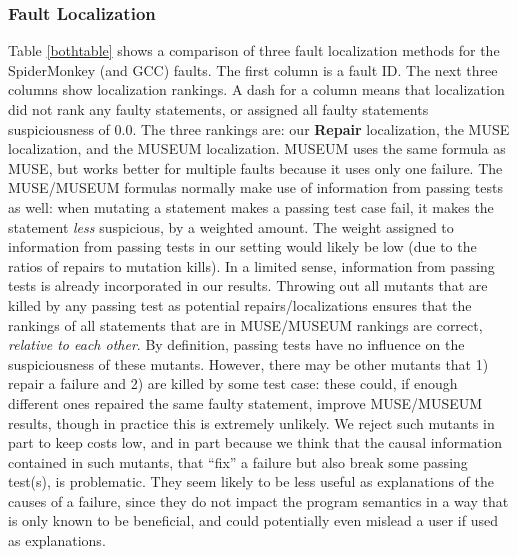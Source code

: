\subsubsection{Fault Localization}

Table \ref{bothtable} shows a comparison of three fault localization methods for the SpiderMonkey (and GCC) faults.  The first column is a fault ID. The next three columns show localization rankings.  A dash for a column means that localization did not rank any faulty statements, or assigned all faulty statements suspiciousness of 0.0.  The three rankings are: our {\bf Repair} localization, the MUSE \cite{MUSE} localization, and the MUSEUM \cite{multilingual} localization.  MUSEUM uses the same formula as MUSE, but works better for multiple faults because it uses only one failure.  The MUSE/MUSEUM formulas normally make use of information from passing tests as well: when mutating a statement makes a passing test case fail, it makes the statement \emph{less} suspicious, by a weighted amount. The weight assigned to information from passing tests in our setting would likely be low (due to the ratios of repairs to mutation kills).  In a limited sense, information from passing tests is already incorporated in our results.  Throwing out all mutants that are killed by any passing test as potential repairs/localizations ensures that the rankings of all statements that are in MUSE/MUSEUM rankings are correct, \emph{relative to each other}.  By definition, passing tests have no influence on the suspiciousness of these mutants.  However, there may be other mutants that 1) repair a failure and 2) are killed by some test case: these could, if enough different ones repaired the same faulty statement, improve MUSE/MUSEUM results, though in practice this is extremely unlikely.  We reject such mutants in part to keep costs low, and in part because we think that the causal information contained in such mutants, that ``fix'' a failure but also break some passing test(s), is problematic.  They seem likely to be less useful as explanations of the causes of a failure, since they do not impact the program semantics in a way that is only known to be beneficial, and could potentially even mislead a user if used as explanations.  

